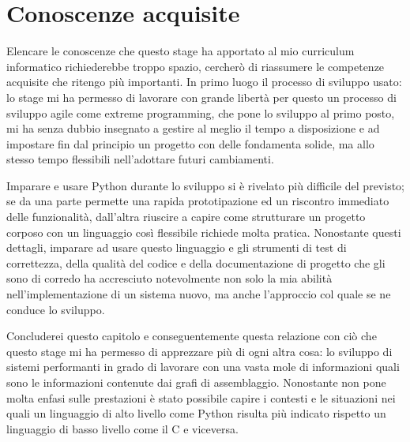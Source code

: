 \section{Conoscenze acquisite}
Elencare le conoscenze che questo stage ha apportato
al mio curriculum informatico richiederebbe troppo spazio,
cercherò di riassumere le competenze acquisite che ritengo più
importanti. In primo luogo il processo di sviluppo usato: lo stage
mi ha permesso di lavorare con grande libertà per questo
un processo di sviluppo agile come extreme programming, 
che pone lo sviluppo al primo posto, mi ha senza dubbio
insegnato a gestire al meglio il tempo a disposizione e ad impostare
fin dal principio un progetto con delle fondamenta solide, ma allo stesso
tempo flessibili nell'adottare futuri cambiamenti.

Imparare e usare Python durante lo sviluppo si è rivelato più
difficile del previsto; se da una parte permette una rapida prototipazione
ed un riscontro immediato delle funzionalità, dall'altra riuscire a
capire come strutturare un progetto corposo con un linguaggio
così flessibile richiede molta pratica. Nonostante questi
dettagli, imparare ad usare questo linguaggio e gli strumenti
di test di correttezza,  della qualità del codice e della documentazione
di progetto che gli sono di corredo ha accresciuto notevolmente
non solo la mia abilità nell'implementazione di un sistema nuovo, ma anche
l'approccio col quale se ne conduce lo sviluppo.

Concluderei questo capitolo e conseguentemente questa relazione
con ciò che questo stage mi ha permesso di apprezzare più di
ogni altra cosa: lo sviluppo di sistemi performanti in grado di
lavorare con una vasta mole di informazioni quali sono le informazioni
contenute dai grafi di assemblaggio. Nonostante \pygfa non
pone molta enfasi sulle prestazioni è stato possibile
capire i contesti e le situazioni nei quali un linguaggio di alto
livello come Python risulta più indicato rispetto un linguaggio
di basso livello come il C e viceversa.






